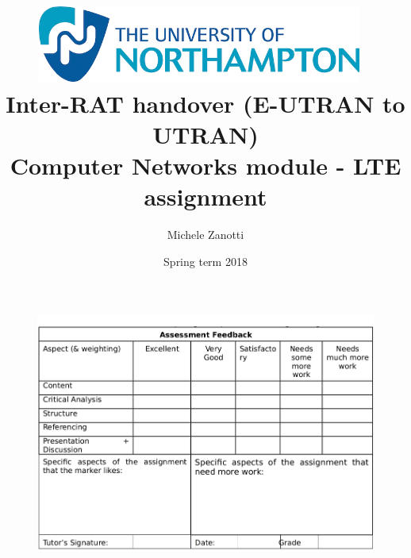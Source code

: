 \documentclass[12pt, a4paper]{article}
\title{
  \includegraphics[width=0.8\textwidth]{img/logo.png}~ \\
  Inter-RAT handover (E-UTRAN to UTRAN) \\ \large Computer Networks module - LTE assignment
}
\author{Michele Zanotti}
\date{Spring term 2018}
\begin{document}
\maketitle
\begin{figure}[htb]
	\centering
	\includegraphics[width=1\linewidth]{img/valuation-table.png}
\end{figure}




\clearpage
\end{document}
